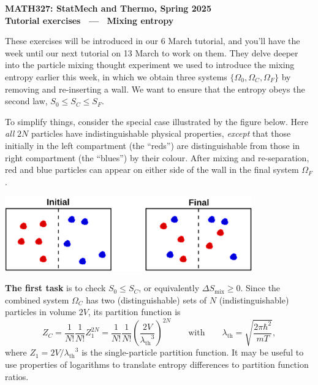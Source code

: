 \documentclass[12 pt]{article} %
\newcommand{\De}{\ensuremath{\Delta} }
\newcommand{\la}{\ensuremath{\lambda} }
\newcommand{\lath}{\ensuremath{\la_{\mathrm{th}}} }
\newcommand{\Om}{\ensuremath{\Omega} }
\begin{document}
\newcommand{\thisunit}{MATH327 Tutorial (Mixing)}
\newcommand{\moddate}{Last modified 5 Mar.~2025}
\begin{center}
  {\Large \textbf{MATH327: StatMech and Thermo, Spring 2025}} \\[12 pt]
  {\Large \textbf{Tutorial exercises \ --- \ Mixing entropy}} \\[24 pt]
\end{center}

These exercises will be introduced in our 6 March tutorial, and you'll have the week until our next tutorial on 13 March to work on them.
They delve deeper into the particle mixing thought experiment we used to introduce the mixing entropy earlier this week, in which we obtain three systems $\{\Om_0, \Om_C, \Om_F\}$ by removing and re-inserting a wall.
We want to ensure that the entropy obeys the second law, $S_0 \leq S_C \leq S_F$.

To simplify things, consider the special case illustrated by the figure below.
Here \textit{all} $2N$ particles have indistinguishable physical properties, \textit{except} that those initially in the left compartment (the ``reds'') are distinguishable from those in right compartment (the ``blues'') by their colour.
After mixing and re-separation, red and blue particles can appear on either side of the wall in the final system $\Om_F$.

\begin{center}\includegraphics[width=0.8\textwidth]{figs/mix.pdf}\end{center}

\textbf{The first task} is to check $S_0 \leq S_C$, or equivalently $\De S_{\text{mix}} \geq 0$.
Since the combined system $\Om_C$ has two (distinguishable) sets of $N$ (indistinguishable) particles in volume $2V$, its partition function is
\begin{equation*}
  Z_C = \frac{1}{N!} \frac{1}{N!} Z_1^{2N} = \frac{1}{N!} \frac{1}{N!} \left(\frac{2V}{\lath^3}\right)^{2N} \qquad \mbox{with} \qquad \lath = \sqrt{\frac{2\pi\hbar^2}{mT}},
\end{equation*}
where $Z_1 = 2V / \lath^3$ is the single-particle partition function.
It may be useful to use properties of logarithms to translate entropy differences to partition function ratios.
\end{document}
